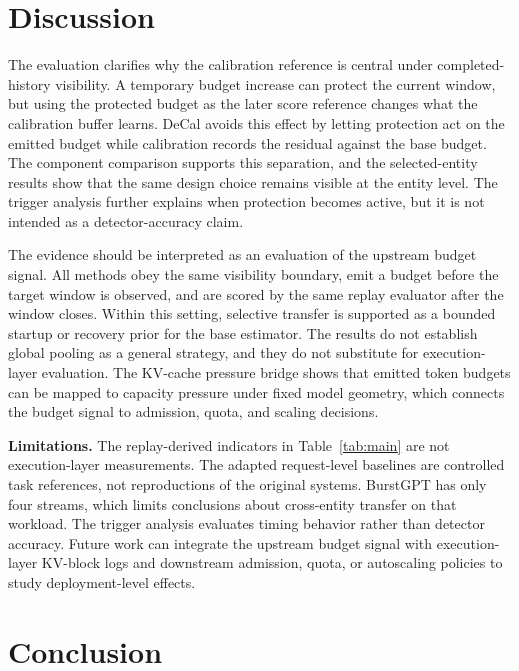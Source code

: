 \documentclass[sigplan,10pt, anonymous]{acmart}
\begin{document}
\section{Discussion}
\label{sec:discussion}

The evaluation clarifies why the calibration reference is central under completed-history visibility. A temporary budget increase can protect the current window, but using the protected budget as the later score reference changes what the calibration buffer learns. DeCal avoids this effect by letting protection act on the emitted budget while calibration records the residual against the base budget. The component comparison supports this separation, and the selected-entity results show that the same design choice remains visible at the entity level. The trigger analysis further explains when protection becomes active, but it is not intended as a detector-accuracy claim.

The evidence should be interpreted as an evaluation of the upstream budget signal. All methods obey the same visibility boundary, emit a budget before the target window is observed, and are scored by the same replay evaluator after the window closes. Within this setting, selective transfer is supported as a bounded startup or recovery prior for the base estimator. The results do not establish global pooling as a general strategy, and they do not substitute for execution-layer evaluation. The KV-cache pressure bridge shows that emitted token budgets can be mapped to capacity pressure under fixed model geometry, which connects the budget signal to admission, quota, and scaling decisions.

\textbf{Limitations.}
The replay-derived indicators in Table~\ref{tab:main} are not execution-layer measurements. The adapted request-level baselines are controlled task references, not reproductions of the original systems. BurstGPT has only four streams, which limits conclusions about cross-entity transfer on that workload. The trigger analysis evaluates timing behavior rather than detector accuracy. Future work can integrate the upstream budget signal with execution-layer KV-block logs and downstream admission, quota, or autoscaling policies to study deployment-level effects.

\section{Conclusion}
\label{sec:conclusion}
\end{document}
